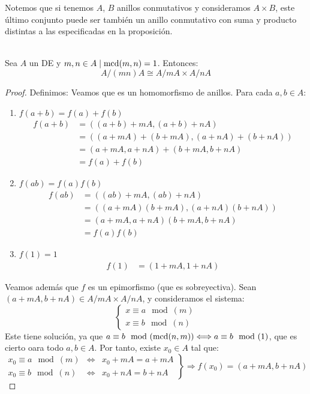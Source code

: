Notemos que si tenemos $A$, $B$ anillos conmutativos y consideramos $A\times B$, este último conjunto puede ser también un anillo
conmutativo con suma y producto distintas a las especificadas en la proposición.

\begin{teo}
    \ \\
    \label{teoChinoResto}
    Sea $A$ un DE y $m, n \in A \mid \operatorname{mcd}(m,n) =1$. Entonces:
    $$A/(mn)A \cong A/mA \times A/nA$$
\begin{proof}
    Definimos:
    Veamos que es un homomorfismo de anillos. Para cada $a,b\in A$:
    \begin{enumerate}
        \item $f(a+b)=f(a)+f(b)$
        \begin{align*}
            f(a+b) &= ((a+b)+mA, (a+b)+nA) \\
            &= ((a+mA)+(b+mA), (a+nA)+(b+nA)) \\
            &= (a+mA, a+nA)+(b+mA,b+nA) \\
            &= f(a) + f(b)
        \end{align*}
        \item $f(ab)=f(a)f(b)$
        \begin{align*}
            f(ab) &= ((ab)+mA, (ab)+nA) \\
            &= ((a+mA)(b+mA), (a+nA)(b+nA)) \\
            &= (a+mA, a+nA)(b+mA,b+nA) \\
            &= f(a)f(b)
        \end{align*}
        \item $f(1)=1$
        \begin{align*}
            f(1) &= (1+mA, 1+nA)
        \end{align*}
    \end{enumerate}
    
    Veamos además que $f$ es un epimorfismo (que es sobreyectiva).
    Sean $(a+mA, b+nA) \in A/mA \times A/nA$, y consideramos el sistema:
    $$\left\{ \begin{array}{l}
            x\equiv a\mod(m) \\
            x\equiv b\mod(n)
        \end{array} \right.$$
    Este tiene solución, ya que $a\equiv b\mod(\operatorname{mcd}(n,m)) \Longleftrightarrow a\equiv b\mod(1)$, que es cierto oara todo $a,b \in A$. Por tanto, existe $x_0 \in A$ tal que:
    $$\left. \begin{array}{llc}
            x_0\equiv a\mod(m) & \Longleftrightarrow & x_0+mA = a+mA \\
            x_0\equiv b\mod(n) & \Longleftrightarrow & x_0+nA = b+nA
        \end{array} \right\} \Longrightarrow f(x_0) = (a+mA, b+nA)$$



\end{proof}
\end{teo}
